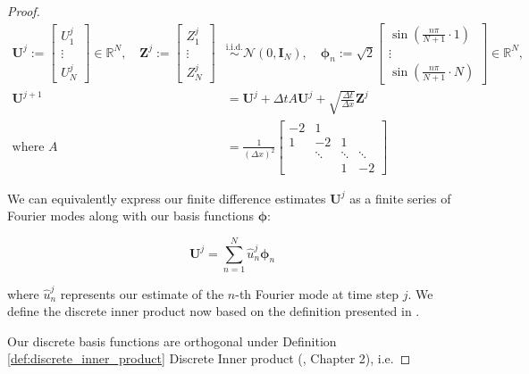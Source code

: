 \begin{proof}
\begin{align}
    \mathbf{U}^j := 
    \begin{bmatrix}
        U_1^j \\
        \vdots \\
        U_N^j
    \end{bmatrix} 
    \in \mathbb{R}^N,
    \quad
    \mathbf{Z}^j := 
    \begin{bmatrix}
        Z_1^j \\
        \vdots \\
        Z_N^j
    \end{bmatrix}
    &\overset{\mathrm{i.i.d.}}{\sim} \mathcal{N}(0, \mathbf{I}_N),
    \quad
    \boldsymbol{\phi}_n := \sqrt{2}
    \begin{bmatrix}
        \sin\left( \frac{n \pi}{N+1} \cdot 1 \right) \\
        \vdots \\
        \sin\left( \frac{n \pi}{N+1} \cdot N \right)
    \end{bmatrix}
    \in \mathbb{R}^N, \\
    \mathbf{U}^{j+1} &= \mathbf{U}^j + \Delta t A \mathbf{U}^j
    + \sqrt{\frac{\Delta t}{\Delta x}} \mathbf{Z}^j \label{eq:scheme_matrix_vector}\\
    \text{where } A &= \frac{1}{(\Delta x)^2}
    \begin{bmatrix}
        -2 & 1 & & \\
        1 & -2 & 1  \\
        & \ddots & \ddots & \ddots \\
        & & 1 & -2
    \end{bmatrix}
\end{align}

We can equivalently express our finite difference estimates $\mathbf{U}^j$
as a finite series of Fourier modes along with our basis functions 
$\boldsymbol{\phi}$:

\begin{equation*}
    \boldsymbol{U}^j = \sum_{n=1}^N \hat{u}_n^j \boldsymbol{\phi}_n
\end{equation*}

where $\hat{u}_n^j$ represents our estimate of the $n$-th Fourier 
mode at time step $j$. We define the discrete inner product now 
based on the definition presented in \cite{suli2025nspdes}.

Our discrete basis functions are orthogonal under Definition \ref{def:discrete_inner_product}
Discrete Inner product (\cite{strang2007computational}, Chapter 2), i.e.


\end{proof}
